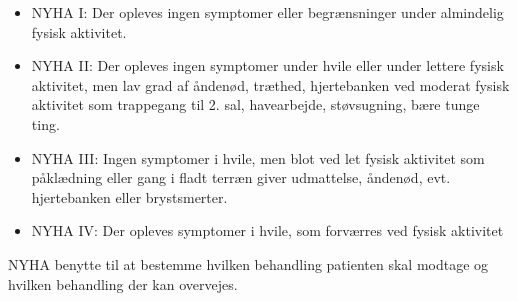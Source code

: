 \begin{itemize} 
\item NYHA I: Der opleves ingen symptomer eller begrænsninger under almindelig fysisk aktivitet.
\item NYHA II: Der opleves ingen symptomer under hvile eller under lettere fysisk aktivitet, men lav grad af åndenød, træthed, hjertebanken ved moderat fysisk aktivitet som trappegang til 2. sal, havearbejde, støvsugning, bære tunge ting.
\item NYHA III:  Ingen symptomer i hvile, men blot ved let fysisk aktivitet som påklædning eller gang i fladt terræn giver udmattelse, åndenød, evt. hjertebanken eller brystsmerter.
\item NYHA IV: Der opleves symptomer i hvile, som forværres ved fysisk aktivitet
\end{itemize}

NYHA benytte til at bestemme hvilken behandling patienten skal modtage og hvilken behandling der kan overvejes. \cite{DCS}